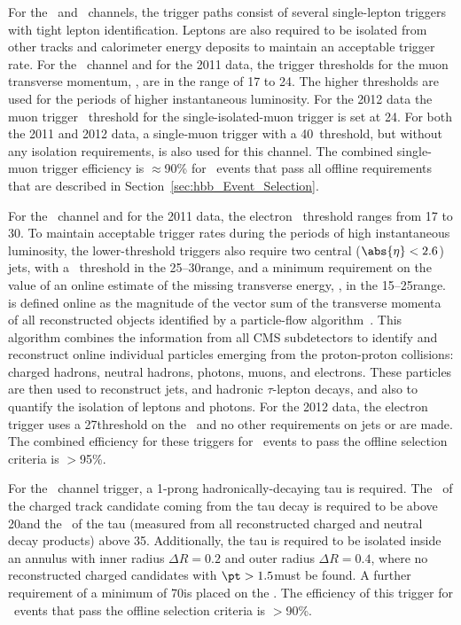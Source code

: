\documentclass[11pt,twoside,a4paper,cmspaper,final,collab]{cms-tdr}
\begin{document}
For the \WmnH\ and  \WenH\ channels, the trigger paths consist of several single-lepton
triggers with tight lepton identification. Leptons are also required
to be isolated from other tracks and calorimeter energy deposits to maintain an acceptable trigger
rate. For the \WmnH\ channel and for the 2011 data, the trigger
thresholds for the muon transverse momentum, \pt, are in the range of 17 to 24\GeV. The higher
thresholds are used for the periods of higher instantaneous
luminosity. For the 2012 data the muon trigger \pt\ threshold for the single-isolated-muon trigger is
set at 24\GeV. For both the 2011 and 2012 data,
a single-muon trigger with a 40\GeV \pt\ threshold, but without any
isolation requirements, is also used for this channel.
The combined single-muon trigger efficiency is ${\approx}$90\% for
\WmnH\ events that pass all offline requirements that are described
in Section~\ref{sec:hbb_Event_Selection}.

For the \WenH\ channel and for the 2011 data, the electron \pt\ threshold ranges from 17 to 30\GeV.
To maintain acceptable trigger
rates during the periods of high instantaneous luminosity,
the lower-threshold triggers also require two central ($\abs{\eta}<2.6$) jets, with a \pt\
threshold in the 25--30\GeV range, and a minimum
requirement on the value of an online estimate of the missing transverse
energy, \MET, in the 15--25\GeV range. \MET is defined online as the magnitude of the vector sum of the transverse momenta
of all reconstructed objects identified by a
particle-flow algorithm~\cite{CMS-PAS-PFT-09-001,CMS-PAS-PFT-10-002}. This
algorithm combines the information
from all CMS subdetectors to identify and reconstruct online individual
particles emerging from the proton-proton collisions: charged hadrons, neutral hadrons,
photons, muons, and electrons.
These particles are then used to reconstruct jets, \MET and hadronic $\tau$-lepton decays,
and also to quantify the isolation of leptons and photons. For the
2012 data, the electron trigger uses a 27\GeV threshold on the \pt\ and no other
requirements on jets or \MET are made.
The combined efficiency for these triggers for \WenH\ events
to pass the offline selection criteria is $>$95\%.



For the \WtnH\ channel trigger, a 1-prong hadronically-decaying tau is required.
The \pt\ of the charged track candidate coming from the tau decay is required to be above 20\GeV and the \pt\
of the tau (measured from all reconstructed charged and neutral decay
products) above 35\GeV.
Additionally, the tau is required to be isolated inside
an annulus with inner radius $\Delta R = 0.2$ and outer
radius $\Delta R = 0.4$, where no reconstructed charged
candidates with $\pt > 1.5$\GeV must be found. A further requirement of a minimum of 70\GeV is placed on the \MET.
The efficiency of this trigger for \WtnH\ events that
pass the offline selection criteria is $>$90\%.
\end{document}
